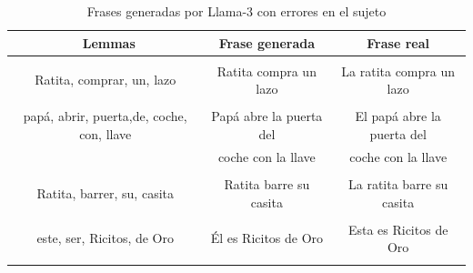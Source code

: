 \documentclass[11pt,spanish,listoffigures,listoftables]{tfgetsinf}
\begin{document}
\begin{table}[!h]
\caption{Frases generadas por Llama-3 con errores en el sujeto}
\begin{center}
\begin{tabular}{ c | c | c }
	\ Lemmas & Frase generada & Frase real \\
	\hline
	\hline
	 & & \\
	Ratita, comprar, un, lazo & Ratita compra un lazo & La ratita compra un lazo \\
	 & & \\
	papá, abrir, puerta,de, coche, con, llave & Papá abre la puerta del & El papá abre la puerta del \\
	 & coche con la llave & coche con la llave \\
	 & & \\
	Ratita, barrer, su, casita & Ratita barre su casita & La ratita barre su casita \\
	 & & \\
	este, ser, Ricitos, de Oro & Él es Ricitos de Oro & Esta es Ricitos de Oro \\
	 & & \\

\end{tabular}
\end{center}
\label{tab:erroresSujeto}
\end{table}
\end{document}
